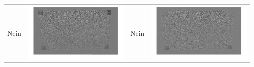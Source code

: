 \begin{table}[htb]
\begin{tabular}{|p{2cm}<{\centering}|c|p{2cm}<{\centering}|c|}
	Nein & \includegraphics[scale=0.15]{images/4_ZweiteErfahrung/Differenzbild/2weis.pdf}& Nein & \includegraphics[scale=0.15]{images/4_ZweiteErfahrung/Differenzbild/3halfweis.pdf}\\

\end{tabular}
\end{table}
